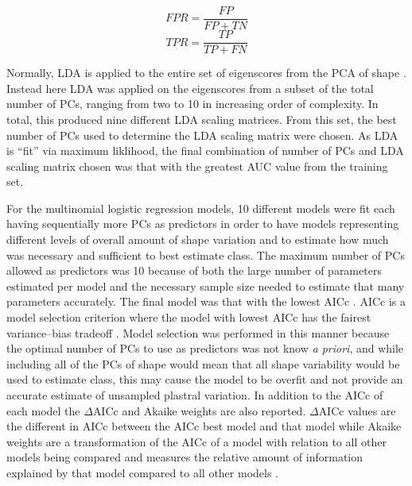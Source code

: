 \documentclass[12pt,letterpaper]{article}\usepackage{graphicx, color}
\begin{document}
\begin{equation}
  FPR = \frac{FP}{FP + TN}
  \label{eq:fpr}
\end{equation}
\begin{equation}
  TPR = \frac{TP}{TP + FN}
  \label{eq:tpr}
\end{equation}

Normally, LDA is applied to the entire set of eigenscores from the PCA of shape \citep{Mitteroecker2011}. Instead here LDA was applied on the eigenscores from a subset of the total number of PCs, ranging from two to 10 in increasing order of complexity. In total, this produced nine different LDA scaling matrices. From this set, the best number of PCs used to determine the LDA scaling matrix were chosen. As LDA is ``fit'' via maximum liklihood, the final combination of number of PCs and LDA scaling matrix chosen was that with the greatest AUC value from the training set.

For the multinomial logistic regression models, 10 different models were fit each having sequentially more PCs as predictors in order to have models representing different levels of overall amount of shape variation and to estimate how much was necessary and sufficient to best estimate class. The maximum number of PCs allowed as predictors was 10 because of both the large number of parameters estimated per model and the necessary sample size needed to estimate that many parameters accurately. The final model was that with the lowest AICc \citep{Akaike1974,Hurvich1989,Burnham2002a}. AICc is a model selection criterion where the model with lowest AICc has the fairest variance--bias tradeoff \citep{Burnham2002a}. Model selection was performed in this manner because the optimal number of PCs to use as predictors was not know \textit{a priori}, and while including all of the PCs of shape would mean that all shape variability would be used to estimate class, this may cause the model to be overfit and not provide an accurate estimate of unsampled plastral variation. In addition to the AICc of each model the \(\Delta\)AICc and Akaike weights are also reported. \(\Delta\)AICc values are the different in AICc between the AICc best model and that model while Akaike weights are a transformation of the AICc of a model with relation to all other models being compared and measures the relative amount of information explained by that model compared to all other models \citep{Burnham2002a}. 
\end{document}
